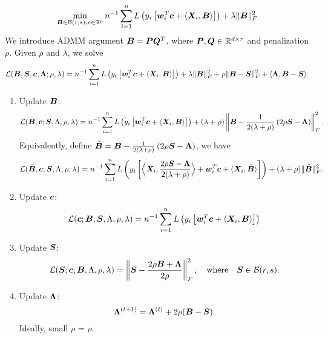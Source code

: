\documentclass[mathptm]{statsoc}
\begin{document}
\[
\min_{\bm B\in\mathcal{B}(r,s), \bm{c}\in\mathbb{R}^p} n^{-1}\sum_{i=1}^nL\left(y_i\left[\bm{w}^T_i\bm{c}+\langle \bm X_i,\bm B\rangle \right]\right) + \lambda \lVert\bm B\rVert_F^2
\]
We introduce ADMM argument $\bm B=\bm{P}\bm{Q}^T$, where $\bm{P},\bm{Q}\in\mathbb{R}^{d\times r}$ and penalization $\rho$. 
Given $\rho$ and $\lambda$, we solve
\[
\mathcal{L}(\bm B,\bm S, \bm{c}, \bm{\Lambda}; \rho, \lambda)=n^{-1}\sum_{i=1}^nL\left(y_i\left[\bm{w}^T_i\bm{c}+\langle \bm X_i,\bm B\rangle \right]\right) + \lambda \lVert\bm B\rVert_F^2+\rho\lVert\bm B-\bm S\rVert_F^2 + \langle \bm{\Lambda}, \bm B-\bm S\rangle.
\]
\begin{enumerate}
\item Update $\bm B$:
\[
\mathcal{L}(\bm B, \bm{c}; \bm S, \Lambda, \rho,\lambda) = n^{-1}\sum_{i=1}^nL\left(y_i\left[\bm{w}^T_i\bm{c}+\langle \bm X_i,\bm B\rangle \right]\right)  + (\lambda+\rho) \left\lVert\bm B-{1\over 2(\lambda+\rho)}\left(2\rho\bm S-\bm{\Lambda}\right)\right\rVert_F^2.
\]
Equivalently, define $\check{\bm B}=\bm B-{1\over 2(\lambda+\rho)}\left(2\rho\bm S-\bm{\Lambda}\right)$, we have
\[
\mathcal{L}(\check {\bm B}, \bm{c}; \bm S, \Lambda, \rho,\lambda) = n^{-1}\sum_{i=1}^nL\left(y_i\left[\Big\langle \bm X_i, {2\rho\bm S-\bm{\Lambda}\over 2(\lambda+\rho)}\Big\rangle+\bm{w}^T_i\bm{c}+\langle \bm X_i,\check{\bm B}\rangle \right]\right)  + (\lambda+\rho)\lVert\check {\bm B}\rVert_F^2.
\]
\item Update $\bm{c}$:
\[
\mathcal{L}(\bm{c};\bm B, \bm S, \Lambda, \rho,\lambda) = n^{-1}\sum_{i=1}^nL\left(y_i\left[\bm{w}^T_i\bm{c}+\langle \bm X_i,\bm B\rangle \right]\right)
\]
\item Update $\bm S$:
\[
\mathcal{L}(\bm S; \bm{c}, \bm B, \Lambda, \rho,\lambda) = \left\lVert\bm S-{2\rho\bm B+\bm{\Lambda}\over 2\rho}\right\rVert_F^2, \quad \text{where}\quad \bm S\in\mathcal{B}(r,s).
\]
\item Update $\bm{\Lambda}$:
\[
\bm{\Lambda}^{(t+1)} = \bm{\Lambda}^{(t)}+2\rho(\bm B-\bm S).
\]
Ideally, small $\rho$ = $\rho$.
\end{enumerate}
\end{document}
